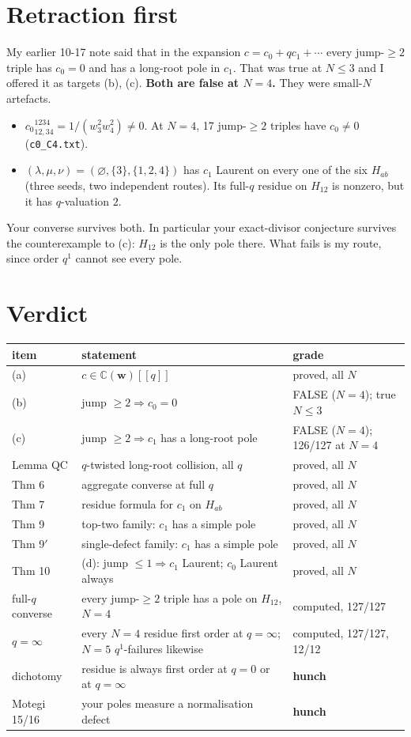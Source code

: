 \documentclass[10pt]{article}
\theoremstyle{plain}
\begin{document}
\section{Retraction first}
My earlier 10-17 note said that in the expansion $c=c_0+qc_1+\cdots$ every jump-$\ge2$ triple has $c_0=0$ and has a long-root pole in $c_1$.
That was true at $N\le3$ and I offered it as targets (b), (c). \textbf{Both are false at $N=4$.} They were small-$N$ artefacts.
\begin{itemize}
\item[(b)] ${c_0}^{1234}_{12,34}=1/(w_3^2w_4^2)\neq0$. At $N=4$, 17 jump-$\ge2$ triples have $c_0\ne0$ (\texttt{c0\_C4.txt}).
\item[(c)] $(\lambda,\mu,\nu)=(\varnothing,\{3\},\{1,2,4\})$ has $c_1$ Laurent on every one of the six $H_{ab}$ (three seeds, two independent routes).
 Its full-$q$ residue on $H_{12}$ is nonzero, but it has $q$-valuation $2$.
\end{itemize}
Your converse survives both. In particular your exact-divisor conjecture survives the counterexample to (c): $H_{12}$ is the only pole there. What fails
is my route, since order $q^1$ cannot see every pole.

\section{Verdict}
\begin{center}\small
\begin{tabular}{@{}lp{9.2cm}l@{}}\toprule
item & statement & grade\\\midrule
(a) & $c\in\mathbb C(\mathbf w)[[q]]$ & proved, all $N$\\
(b) & jump $\ge2\Rightarrow c_0=0$ & FALSE ($N=4$); true $N\le3$\\
(c) & jump $\ge2\Rightarrow c_1$ has a long-root pole & FALSE ($N=4$); 126/127 at $N=4$\\
Lemma QC & $q$-twisted long-root collision, all $q$ & proved, all $N$\\
Thm 6 & aggregate converse at full $q$ & proved, all $N$\\
Thm 7 & residue formula for $c_1$ on $H_{ab}$ & proved, all $N$\\
Thm 9 & top-two family: $c_1$ has a simple pole & proved, all $N$\\
Thm 9$'$ & single-defect family: $c_1$ has a simple pole & proved, all $N$\\
Thm 10 & (d): jump $\le1\Rightarrow c_1$ Laurent; $c_0$ Laurent always & proved, all $N$\\
full-$q$ converse & every jump-$\ge2$ triple has a pole on $H_{12}$, $N=4$ & computed, 127/127\\
$q=\infty$ & every $N=4$ residue first order at $q=\infty$; $N=5$ $q^1$-failures likewise & computed, 127/127, 12/12\\
dichotomy & residue is always first order at $q=0$ or at $q=\infty$ & \textbf{hunch}\\
Motegi 15/16 & your poles measure a normalisation defect & \textbf{hunch}\\\bottomrule
\end{tabular}
\end{center}
\end{document}

